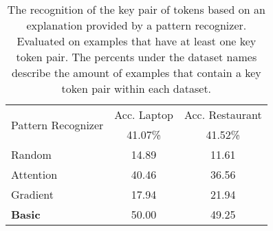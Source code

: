 \begin{table}[h]
\renewcommand\thetable{5}
\captionsetup{font=footnotesize}
\vspace*{10pt}
\centering

\begin{tabular}{l c c}
\toprule
\multirow{2}{*}{Pattern Recognizer} & Acc. Laptop & Acc. Restaurant \\
                                    & 41.07\% & 41.52\% \\
\midrule
Random         & 14.89 & 11.61 \\
Attention      & 40.46 & 36.56 \\
Gradient       & 17.94 & 21.94 \\
\textbf{Basic} & 50.00 & 49.25 \\
\bottomrule
\end{tabular}

\caption{
The recognition of the key pair of tokens based on an explanation provided by a pattern recognizer.
Evaluated on examples that have at least one key token pair.
The percents under the dataset names describe the amount of examples that contain a key token pair within each dataset.
}
\label{tab:recognition-key-token-pair}
\end{table}


